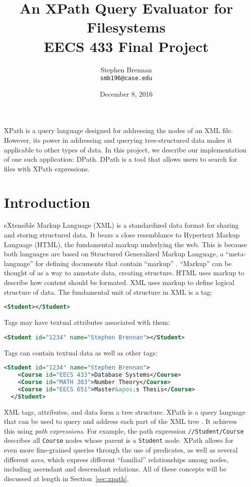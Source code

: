 \documentclass{article}
\title{An XPath Query Evaluator for Filesystems \\ EECS 433 Final Project}
\date{December 8, 2016}
\author{Stephen Brennan \\ \texttt{smb196@case.edu}}
\begin{document}
\maketitle

\abstract

XPath is a query language designed for addressing the nodes of an XML file.
However, its power in addressing and querying tree-structured data makes it
applicable to other types of data. In this project, we describe our
implementation of one such application: DPath. DPath is a tool that allows users
to search for files with XPath expressions.

\section{Introduction}

eXtensible Markup Language (XML) is a standardized data format for sharing and
storing structured data. It bears a close resemblance to Hypertext Markup
Language (HTML), the fundamental markup underlying the web. This is because both
languages are based on Structured Generalized Markup Language, a
``meta-language'' for defining documents that contain ``markup'' \cite{sgml}.
``Markup'' can be thought of as a way to annotate data, creating structure. HTML
uses markup to describe how content should be formated. XML uses markup to
define logical structure of data. The fundamental unit of structure in XML is a
tag:

\begin{lstlisting}[language=XML]
  <Student></Student>
\end{lstlisting}

Tags may have textual attributes associated with them:

\begin{lstlisting}[language=XML]
  <Student id="1234" name="Stephen Brennan"></Student>
\end{lstlisting}

Tags can contain textual data as well as other tags:

\begin{lstlisting}[language=XML]
  <Student id="1234" name="Stephen Brennan">
    <Course id="EECS 433">Database Systems</Course>
    <Course id="MATH 303">Number Theory</Course>
    <Course id="EECS 651">Master&apos;s Thesis</Course>
  </Student>
\end{lstlisting}

XML tags, attributes, and data form a tree structure. XPath is a query language
that can be used to query and address each part of the XML tree \cite{xpath}. It
achieves this using \emph{path expressions}. For example, the path expression
\texttt{//Student/Course} describes all \texttt{Course} nodes whose parent is a
\texttt{Student} node. XPath allows for even more fine-grained queries through
the use of predicates, as well as several different \emph{axes}, which express
different ``familial'' relationships among nodes, including ascendant and
descendant relations. All of these concepts will be discussed at length in
Section~\ref{sec:xpath}.
\end{document}
